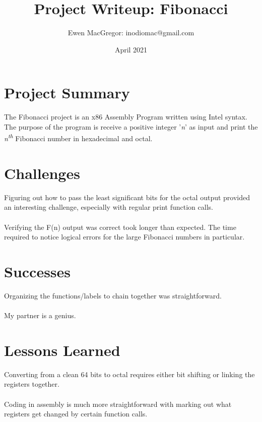 \documentclass{article}
\title{Project Writeup: Fibonacci}
\author{Ewen MacGregor: inodiomac@gmail.com}
\date{April 2021}
\begin{document}
\maketitle

\section{Project Summary}
The Fibonacci project is an x86 Assembly Program written using Intel syntax. The purpose of the program is receive a positive integer '\textit{n}' as input and print the \textit{n\textsuperscript{th}} Fibonacci number in hexadecimal and octal.

\section{Challenges}
Figuring out how to pass the least significant bits for the octal output provided an interesting challenge, especially with regular print function calls. 
\\\null\\
Verifying the F(n) output was correct took longer than expected. The time required to notice logical errors for the large Fibonacci numbers in particular.

\section{Successes}
Organizing the functions/labels to chain together was straightforward.
\\\null\\
My partner is a genius.

\section{Lessons Learned}
Converting from a clean 64 bits to octal requires either bit shifting or linking the registers together.
\\\null\\
Coding in assembly is much more straightforward with marking out what registers get changed by certain function calls.
\end{document}
